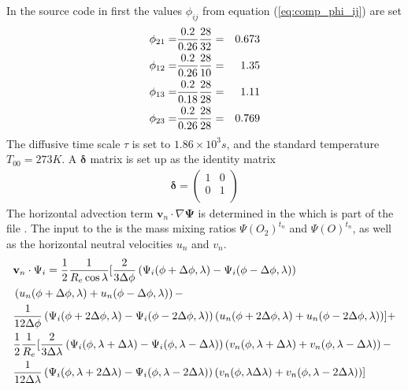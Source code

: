 In the source code in  first the values $\phi_{ij}$ from
equation (\ref{eq:comp_phi_ij}) are set
%
\begin{align}
  \phi_{21} = & \frac{0.2}{0.26}\frac{28}{32} = & 0.673 \notag \\
  \phi_{12} = & \frac{0.2}{0.26}\frac{28}{10} = & 1.35  \notag \\
  \phi_{13} = & \frac{0.2}{0.18}\frac{28}{28} = & 1.11  \notag \\
  \phi_{23} = & \frac{0.2}{0.26}\frac{28}{28} = & 0.769
\end{align}
%
The diffusive time scale $\tau$ is set to $1.86 \times 10^3 s$, and
the standard temperature $T_{00}= 273 K$. A $\mathbf{\delta}$ matrix
is set up as the identity matrix
%
\begin{align}
 \mathbf{\delta} = \left(
   \begin{array}{cc}
    1 & 0 \\
    0 & 1 \\
  \end{array}
 \right)
\end{align}
%
The horizontal advection term $\mathbf{v}_n \cdot \nabla
\mathbf{\Psi}$ is determined in the  which is
part of the file . The input to the  is the mass mixing ratios $\Psi(O_2)^{t_n}$ and
$\Psi(O)^{t_n}$, as well as the horizontal neutral velocities $u_n$
and $v_n$.
%
\begin{align}
 & \mathbf{v}_n \cdot \Psi_i  = \frac{1}{2} \frac{1}{R_e \cos \lambda}
  [ \frac{2}{3 \Delta \phi} \left( \Psi_i(\phi + \Delta \phi, \lambda) -
   \Psi_i(\phi - \Delta \phi, \lambda) \right) \notag \\
   & \left( u_n(\phi + \Delta \phi, \lambda)
   +  u_n(\phi - \Delta \phi, \lambda)\right) - \notag \\
   & \frac{1}{12 \Delta \phi} \left( \Psi_i(\phi + 2\Delta \phi, \lambda) -
   \Psi_i(\phi - 2\Delta \phi, \lambda) \right) \left( u_n(\phi + 2\Delta \phi, \lambda)
   +  u_n(\phi - 2\Delta \phi, \lambda)\right)] + \notag \\
   & \frac{1}{2}\frac{1}{R_e}
  [ \frac{2}{3 \Delta \lambda} \left( \Psi_i(\phi, \lambda+ \Delta \lambda) -
   \Psi_i(\phi , \lambda-\Delta \lambda) \right) \left( v_n(\phi , \lambda+\Delta \lambda)
   +  v_n(\phi , \lambda-\Delta \lambda)\right) - \notag \\
   & \frac{1}{12 \Delta \lambda} \left( \Psi_i(\phi , \lambda+2\Delta \lambda) -
   \Psi_i(\phi , \lambda-2\Delta \lambda) \right) \left( v_n(\phi , \lambda\Delta \lambda)
   +  v_n(\phi , \lambda-2 \Delta \lambda)\right)]
\end{align}
